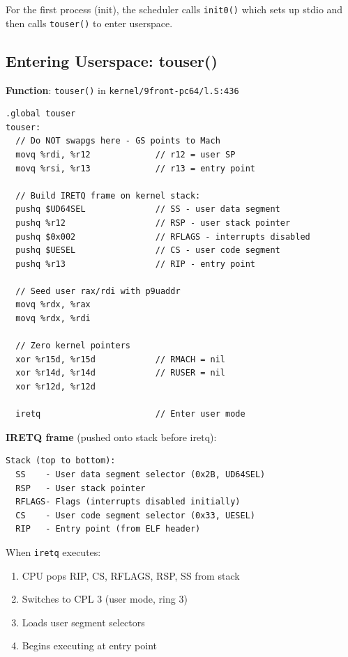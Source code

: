 \documentclass[11pt,letterpaper]{article}
\begin{document}
For the first process (init), the scheduler calls \texttt{init0()} which sets up stdio and then calls \texttt{touser()} to enter userspace.

\subsection{Entering Userspace: touser()}

\textbf{Function}: \texttt{touser()} in \texttt{kernel/9front-pc64/l.S:436}

\begin{lstlisting}[language={[x86masm]Assembler},caption=touser() assembly]
.global touser
touser:
  // Do NOT swapgs here - GS points to Mach
  movq %rdi, %r12             // r12 = user SP
  movq %rsi, %r13             // r13 = entry point

  // Build IRETQ frame on kernel stack:
  pushq $UD64SEL              // SS - user data segment
  pushq %r12                  // RSP - user stack pointer
  pushq $0x002                // RFLAGS - interrupts disabled
  pushq $UESEL                // CS - user code segment
  pushq %r13                  // RIP - entry point

  // Seed user rax/rdi with p9uaddr
  movq %rdx, %rax
  movq %rdx, %rdi

  // Zero kernel pointers
  xor %r15d, %r15d            // RMACH = nil
  xor %r14d, %r14d            // RUSER = nil
  xor %r12d, %r12d

  iretq                       // Enter user mode
\end{lstlisting}

\textbf{IRETQ frame} (pushed onto stack before iretq):

\begin{verbatim}
Stack (top to bottom):
  SS    - User data segment selector (0x2B, UD64SEL)
  RSP   - User stack pointer
  RFLAGS- Flags (interrupts disabled initially)
  CS    - User code segment selector (0x33, UESEL)
  RIP   - Entry point (from ELF header)
\end{verbatim}

When \texttt{iretq} executes:
\begin{enumerate}
\item CPU pops RIP, CS, RFLAGS, RSP, SS from stack
\item Switches to CPL 3 (user mode, ring 3)
\item Loads user segment selectors
\item Begins executing at entry point
\end{enumerate}
\end{document}
